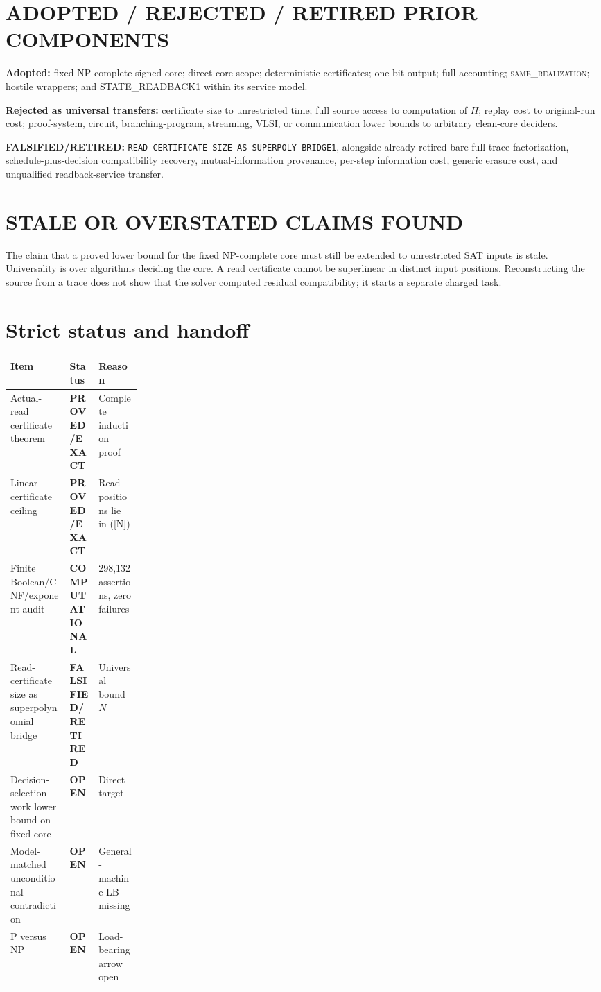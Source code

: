 \documentclass[11pt]{article}
\newcommand{\EXACT}{\textbf{PROVED/EXACT}}
\newcommand{\COMP}{\textbf{COMPUTATIONAL}}
\newcommand{\OPEN}{\textbf{OPEN}}
\newcommand{\RET}{\textbf{FALSIFIED/RETIRED}}
\newcommand{\same}{\textsc{same\_realization}}
\begin{document}
\section{ADOPTED / REJECTED / RETIRED PRIOR COMPONENTS}
\textbf{Adopted:} fixed NP-complete signed core; direct-core scope;
deterministic certificates; one-bit output; full accounting; \same{}; hostile
wrappers; and STATE\_READBACK1 within its service model.

\textbf{Rejected as universal transfers:} certificate size to unrestricted
time; full source access to computation of \(H\); replay cost to original-run
cost; proof-system, circuit, branching-program, streaming, VLSI, or
communication lower bounds to arbitrary clean-core deciders.

\textbf{FALSIFIED/RETIRED:}
\texttt{READ-CERTIFICATE-SIZE-AS-SUPERPOLY-BRIDGE1}, alongside already retired
bare full-trace factorization, schedule-plus-decision compatibility recovery,
mutual-information provenance, per-step information cost, generic erasure cost,
and unqualified readback-service transfer.

\section{STALE OR OVERSTATED CLAIMS FOUND}
The claim that a proved lower bound for the fixed NP-complete core must still be
extended to unrestricted SAT inputs is stale.  Universality is over algorithms
deciding the core.  A read certificate cannot be superlinear in distinct input
positions.  Reconstructing the source from a trace does not show that the
solver computed residual compatibility; it starts a separate charged task.

\section{Strict status and handoff}
\begin{center}
\begin{tabularx}{0.98\linewidth}{Xp{0.22\linewidth}X}
\toprule Item & Status & Reason\\ \midrule
Actual-read certificate theorem & \EXACT & Complete induction proof\\
Linear certificate ceiling & \EXACT & Read positions lie in ([N])\\
Finite Boolean/CNF/exponent audit & \COMP & 298,132 assertions, zero failures\\
Read-certificate size as superpolynomial bridge & \RET & Universal bound \(N\)\\
Decision-selection work lower bound on fixed core & \OPEN & Direct target\\
Model-matched unconditional contradiction & \OPEN & General-machine LB missing\\
P versus NP & \OPEN & Load-bearing arrow open\\ \bottomrule
\end{tabularx}
\end{center}
\end{document}
